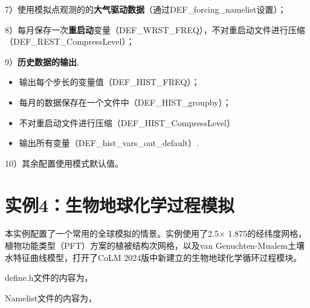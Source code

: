 \documentclass[a4paper,12pt,twoside]{article}
\begin{document}
\par
7）使用模拟点观测的的\textbf{大气驱动数据}（通过DEF\_forcing\_namelist设置）；\par
8）每月保存一次\textbf{重启动}变量（DEF\_WRST\_FREQ），不对重启动文件进行压缩（DEF\_REST\_CompressLevel）；\par
9）\textbf{历史数据的输出},
\begin{itemize}[nosep,leftmargin=4em]
    \item 输出每个步长的变量值（DEF\_HIST\_FREQ）；
    \item 每月的数据保存在一个文件中（DEF\_HIST\_groupby）；
    \item 不对重启动文件进行压缩（DEF\_HIST\_CompressLevel）
    \item 输出所有变量（DEF\_hist\_vars\_out\_default）.
\end{itemize} \par
10）其余配置使用模式默认值。

\section{实例4：生物地球化学过程模拟}

本实例配置了一个常用的全球模拟的情景。实例使用了2.5\textdegree $\times$ 1.875\textdegree 的经纬度网格，植物功能类型（PFT）方案的植被结构次网格，以及van Genuchten-Mualem土壤水特征曲线模型，打开了CoLM 2024版中新建立的生物地球化学循环过程模块。

define.h文件的内容为，


Namelist文件的内容为，

\end{document}
